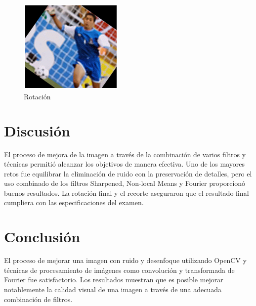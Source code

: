 \documentclass{article}
\begin{document}
\begin{figure}[!ht]
    \centering
    \includegraphics[width=0.45\textwidth]{images/Rotated Image.png}
    \caption{Rotación}
    \label{fig:img7}
\end{figure}

\section{Discusión}
El proceso de mejora de la imagen a través de la combinación de varios filtros y técnicas permitió alcanzar los objetivos de manera efectiva. Uno de los mayores retos fue equilibrar la eliminación de ruido con la preservación de detalles, pero el uso combinado de los filtros Sharpened, Non-local Means y Fourier proporcionó buenos resultados. La rotación final y el recorte aseguraron que el resultado final cumpliera con las especificaciones del examen.

\section{Conclusión}
El proceso de mejorar una imagen con ruido y desenfoque utilizando OpenCV y técnicas de procesamiento de imágenes como convolución y transformada de Fourier fue satisfactorio. Los resultados muestran que es posible mejorar notablemente la calidad visual de una imagen a través de una adecuada combinación de filtros.
\small


\end{document}
